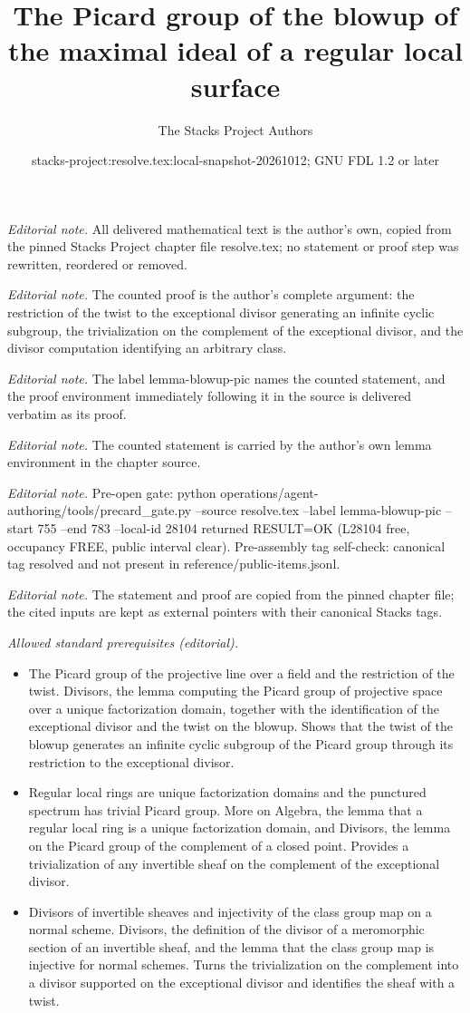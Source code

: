 \documentclass[10pt,a4paper]{amsart}
\title{The Picard group of the blowup of the maximal ideal of a regular local surface}
\author{The Stacks Project Authors}
\date{stacks-project:resolve.tex:local-snapshot-20261012; GNU FDL 1.2 or later}
\theoremstyle{plain}
\theoremstyle{definition}
\theoremstyle{remark}
\numberwithin{equation}{subsection}
\begin{document}
\maketitle
\noindent\textit{Editorial note.} All delivered mathematical text is the author's own, copied from the pinned Stacks Project chapter file resolve.tex; no statement or proof step was rewritten, reordered or removed.\par\medskip
\noindent\textit{Editorial note.} The counted proof is the author's complete argument: the restriction of the twist to the exceptional divisor generating an infinite cyclic subgroup, the trivialization on the complement of the exceptional divisor, and the divisor computation identifying an arbitrary class.\par\medskip
\noindent\textit{Editorial note.} The label lemma-blowup-pic names the counted statement, and the proof environment immediately following it in the source is delivered verbatim as its proof.\par\medskip
\noindent\textit{Editorial note.} The counted statement is carried by the author's own lemma environment in the chapter source.\par\medskip
\noindent\textit{Editorial note.} Pre-open gate: python operations/agent-authoring/tools/precard\_gate.py --source resolve.tex --label lemma-blowup-pic --start 755 --end 783 --local-id 28104 returned RESULT=OK (L28104 free, occupancy FREE, public interval clear). Pre-assembly tag self-check: canonical tag resolved and not present in reference/public-items.jsonl.\par\medskip
\noindent\textit{Editorial note.} The statement and proof are copied from the pinned chapter file; the cited inputs are kept as external pointers with their canonical Stacks tags.\par\medskip
\noindent\textit{Allowed standard prerequisites (editorial).}\begin{itemize}
\item The Picard group of the projective line over a field and the restriction of the twist. Divisors, the lemma computing the Picard group of projective space over a unique factorization domain, together with the identification of the exceptional divisor and the twist on the blowup. Shows that the twist of the blowup generates an infinite cyclic subgroup of the Picard group through its restriction to the exceptional divisor.
\item Regular local rings are unique factorization domains and the punctured spectrum has trivial Picard group. More on Algebra, the lemma that a regular local ring is a unique factorization domain, and Divisors, the lemma on the Picard group of the complement of a closed point. Provides a trivialization of any invertible sheaf on the complement of the exceptional divisor.
\item Divisors of invertible sheaves and injectivity of the class group map on a normal scheme. Divisors, the definition of the divisor of a meromorphic section of an invertible sheaf, and the lemma that the class group map is injective for normal schemes. Turns the trivialization on the complement into a divisor supported on the exceptional divisor and identifies the sheaf with a twist.
\end{itemize}\medskip
\end{document}
